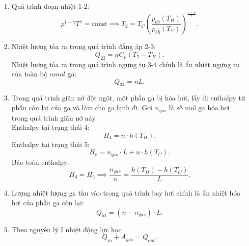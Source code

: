 \begin{enumerate}
    \item Quá trình đoạn nhiệt 1-2: 
    \begin{equation} \label{eq1_vapor_compression_cycle}
        p^{1-\gamma}T^{\gamma}= \text{const} \implies T_2 = T_C \left(\dfrac{p_{bh}(T_H)}{p_{bh}(T_C)}\right)^\frac{\gamma-1}{\gamma}.
    \end{equation}
    \item Nhiệt lượng tỏa ra trong quá trình đẳng áp 2-3:
    \begin{equation} \label{eq2_vapor_compression_cycle}
        Q_{23} = n C_p \left(T_2 - T_H \right).
    \end{equation}
    Nhiệt lượng tỏa ra trong quá trình ngưng tụ 3-4 chính là ẩn nhiệt ngưng tụ của toàn bộ $n \si{mol}$ ga:
    \begin{equation} \label{eq3_vapor_compression_cycle}
        Q_{34} = nL.
    \end{equation}
    \item Trong quá trình giãn nở đột ngột, một phần ga bị hóa hơi, lấy đi enthalpy từ phần còn lại của ga và làm cho ga lạnh đi. Gọi \(n_{gas}\) là số mol ga hóa hơi trong quá trình giãn nở này.\\
    Enthalpy tại trạng thái 4: 
    \begin{equation} \label{eq4_vapor_compression_cycle}
        H_4=n\cdot h(T_H).
    \end{equation}
    Enthalpy tại trạng thái 5:
    \begin{equation} \label{eq5_vapor_compression_cycle}
        H_5=n_{gas}\cdot L + n \cdot h(T_C).
    \end{equation}
    Bảo toàn enthalpy: 
    \begin{equation} \label{eq6_vapor_compression_cycle}
        H_4 = H_5 \implies \dfrac{n_{gas}}{n} = \dfrac{h(T_H)-h(T_C)}{L}.
    \end{equation}
    \item Lượng nhiệt lượng ga thu vào trong quá trình bay hơi chính là ẩn nhiệt hóa hơi của phần ga còn lại: 
    \begin{equation} \label{eq7_vapor_compression_cycle}
        Q_{51}=(n-n_{gas})\cdot L.
    \end{equation}
    \item Theo nguyên lý I nhiệt động lực học
    \begin{equation} \label{eq8_vapor_compression_cycle}
        Q_{in} + A_{gas} = Q_{out}.
    \end{equation}

\end{enumerate}
